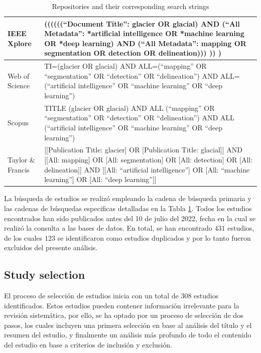 \documentclass{article}
\begin{document}
\begin{table}[H]
    \centering
    \caption{Repositories and their corresponding search strings}
    \hspace{1cm}
    \label{tab:repositories_and_their_corresponding_search_strings}
    \begin{tabularx}{\textwidth}{lX}
        \hline
        IEEE Xplore       & ((((((“Document Title”: glacier OR glacial) AND (“All Metadata”: *artificial intelligence OR *machine learning OR *deep learning) AND (“All Metadata”: mapping OR segmentation OR detection OR delineation))) )) )                                 \\ \hline
        Web of Science    & TI=(glacier OR glacial) AND ALL=(“mapping” OR “segmentation” OR “detection” OR “delineation”) AND ALL=(“artificial intelligence” OR “machine learning” OR “deep learning”)                                                                         \\ \hline
        Scopus            & TITLE (glacier OR glacial) AND ALL (“mapping” OR “segmentation” OR “detection” OR “delineation”) AND ALL (“artificial intelligence” OR “machine learning” OR “deep learning”)                                                                      \\ \hline
        Taylor \& Francis & [[Publication Title: glacier] OR [Publication Title: glacial]] AND [[All: mapping] OR [All: segmentation] OR [All: detection] OR [All: delineation]] AND [[All: “artificial intelligence”] OR [All: “machine learning”] OR [All: “deep learning”]] \\ \hline
    \end{tabularx}
\end{table}

La búsqueda de estudios se realizó empleando la cadena de búsqueda primaria y las cadenas de búsquedas especificas detalladas en la Tabla \ref{tab:repositories_and_their_corresponding_search_strings}.
Todos los estudios encontrados han sido publicados antes del 10 de julio del 2022, fecha en la cual se realizó la consulta a las bases de datos.
En total, se han encontrado $431$ estudios, de los cuales $123$ se identificaron como estudios duplicados y por lo tanto fueron excluidos del presente análisis.

\subsection{Study selection}

El proceso de selección de estudios inicia con un total de $308$ estudios identificados.
Estos estudios pueden contener información irrelevante para la revisión sistemática, por ello, se ha optado por un proceso de selección de dos pasos, los cuales incluyen una primera selección en base al análisis del título y el resumen del estudio, y finalmente un análisis más profundo de todo el contenido del estudio en base a criterios de inclusión y exclusión.
\end{document}
